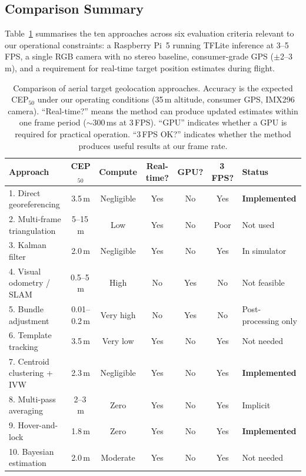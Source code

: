 \FloatBarrier
\subsection{Comparison Summary}\label{sec:approach-comparison}

Table~\ref{tab:approach-comparison} summarises the ten approaches across six evaluation criteria relevant to our operational constraints: a Raspberry Pi~5 running TFLite inference at 3--5\,FPS, a single RGB camera with no stereo baseline, consumer-grade GPS ($\pm$2--3\,m), and a requirement for real-time target position estimates during flight.

\begin{table}[H]
  \centering
  \caption{Comparison of aerial target geolocation approaches.  Accuracy is the expected CEP$_{50}$ under our operating conditions (35\,m altitude, consumer GPS, IMX296 camera).  ``Real-time?'' means the method can produce updated estimates within one frame period ($\sim$300\,ms at 3\,FPS).  ``GPU'' indicates whether a GPU is required for practical operation.  ``3\,FPS OK?'' indicates whether the method produces useful results at our frame rate.}
  \label{tab:approach-comparison}
  \small
  \begin{tabular}{@{}p{4.2cm}cccccp{3.2cm}@{}}
    \toprule
    \textbf{Approach} & \textbf{CEP$_{50}$} & \textbf{Compute} & \textbf{Real-time?} & \textbf{GPU?} & \textbf{3\,FPS?} & \textbf{Status} \\
    \midrule
    1. Direct georeferencing     & 3.5\,m  & Negligible & Yes & No  & Yes & \textbf{Implemented} \\
    2. Multi-frame triangulation & 5--15\,m & Low       & Yes & No  & Poor & Not used \\
    3. Kalman filter             & 2.0\,m  & Negligible & Yes & No  & Yes & In simulator \\
    4. Visual odometry / SLAM    & 0.5--5\,m & High     & No  & Yes & No  & Not feasible \\
    5. Bundle adjustment         & 0.01--0.2\,m & Very high & No & Yes & No & Post-processing only \\
    6. Template tracking         & 3.5\,m  & Very low   & Yes & No  & Yes & Not needed \\
    7. Centroid clustering + IVW & 2.3\,m  & Negligible & Yes & No  & Yes & \textbf{Implemented} \\
    8. Multi-pass averaging      & 2--3\,m & Zero       & Yes & No  & Yes & Implicit \\
    9. Hover-and-lock            & 1.8\,m  & Zero       & Yes & No  & Yes & \textbf{Implemented} \\
    10. Bayesian estimation      & 2.0\,m  & Moderate   & Yes & No  & Yes & Not needed \\
    \bottomrule
  \end{tabular}
\end{table}

